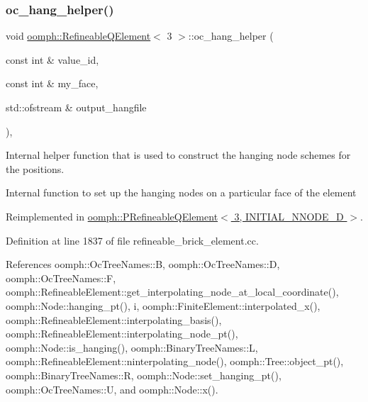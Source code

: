 \subsubsection{\texorpdfstring{oc\+\_\+hang\+\_\+helper()}{oc\_hang\_helper()}}
{\footnotesize\ttfamily void \hyperlink{classoomph_1_1RefineableQElement}{oomph\+::\+Refineable\+Q\+Element}$<$ 3 $>$\+::oc\+\_\+hang\+\_\+helper (\begin{DoxyParamCaption}\item[{const int \&}]{value\+\_\+id,  }\item[{const int \&}]{my\+\_\+face,  }\item[{std\+::ofstream \&}]{output\+\_\+hangfile }\end{DoxyParamCaption})\hspace{0.3cm}{\ttfamily [protected]}, {\ttfamily [virtual]}}



Internal helper function that is used to construct the hanging node schemes for the positions. 

Internal function to set up the hanging nodes on a particular face of the element 

Reimplemented in \hyperlink{classoomph_1_1PRefineableQElement_3_013_00_01INITIAL__NNODE__1D_01_4_ae291430b43e01a7d20c411ef4ac79e45}{oomph\+::\+P\+Refineable\+Q\+Element$<$ 3, I\+N\+I\+T\+I\+A\+L\+\_\+\+N\+N\+O\+D\+E\+\_\+D $>$}.



Definition at line 1837 of file refineable\+\_\+brick\+\_\+element.\+cc.



References oomph\+::\+Oc\+Tree\+Names\+::B, oomph\+::\+Oc\+Tree\+Names\+::D, oomph\+::\+Oc\+Tree\+Names\+::F, oomph\+::\+Refineable\+Element\+::get\+\_\+interpolating\+\_\+node\+\_\+at\+\_\+local\+\_\+coordinate(), oomph\+::\+Node\+::hanging\+\_\+pt(), i, oomph\+::\+Finite\+Element\+::interpolated\+\_\+x(), oomph\+::\+Refineable\+Element\+::interpolating\+\_\+basis(), oomph\+::\+Refineable\+Element\+::interpolating\+\_\+node\+\_\+pt(), oomph\+::\+Node\+::is\+\_\+hanging(), oomph\+::\+Binary\+Tree\+Names\+::L, oomph\+::\+Refineable\+Element\+::ninterpolating\+\_\+node(), oomph\+::\+Tree\+::object\+\_\+pt(), oomph\+::\+Binary\+Tree\+Names\+::R, oomph\+::\+Node\+::set\+\_\+hanging\+\_\+pt(), oomph\+::\+Oc\+Tree\+Names\+::U, and oomph\+::\+Node\+::x().

\mbox{\label{classoomph_1_1RefineableQElement_3_013_01_4_ae80b5899ce103e76f1ccea34d371c2ed}} 
